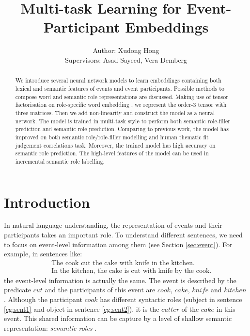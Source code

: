 \documentclass[a4paper]{article}
\title{Multi-task Learning for Event-Participant Embeddings}
\author{Author: Xudong Hong \\ 
Supervisors: Asad Sayeed, Vera Demberg}
\begin{document}
\maketitle


\begin{abstract}
\noindent
We introduce several neural network models to learn embeddings containing both lexical and semantic features of events and event participants. Possible methods to compose word and semantic role representations are discussed. Making use of tensor factorisation on role-specific word embedding \citep{tilk2016event}, we represent the order-3 tensor with three matrices. Then we add non-linearity and construct the model as a neural network. The model is trained in multi-task style to perform both semantic role-filler prediction and semantic role prediction. Comparing to previous work, the model has improved on both semantic role/role-filler modelling and human thematic fit judgement correlations task. Moreover, the trained model has high accuracy on semantic role prediction. The high-level features of the model can be used in incremental semantic role labelling. 
\end{abstract}



\section{Introduction} \label{sec:intro}
In natural language understanding, the representation of events and their participants takes an important role. To understand different sentences, we need to focus on event-level information among them  (see Section \ref{sec:event}). For example, in sentences like: 
\begin{eqnarray}
    & &\text{The cook cut the cake with knife in the kitchen.}        \label{eg:sent1} \\   
    & &\text{In the kitchen, the cake is cut with knife by the cook.} \label{eg:sent2}
\end{eqnarray}
the event-level information is actually the same. The event is described by the predicate $cut$ and the participants of this event are $cook$, $cake$, $knife$ and $kitchen$. Although the participant $cook$ has different syntactic roles (subject in sentence \eqref{eg:sent1} and object in sentence \eqref{eg:sent2}), it is the $cutter$ of the $cake$ in this event. This shared information can be capture by a level of shallow semantic representation: \textit{semantic roles} \citep{jurafsky2014speech}. 
\end{document}
